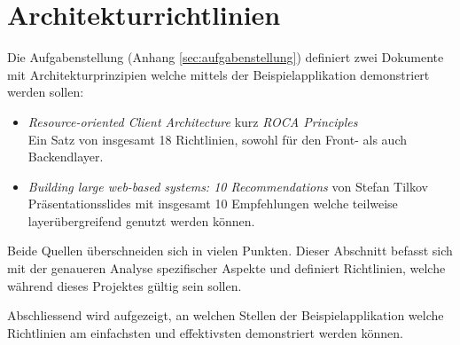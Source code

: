 \section{Architekturrichtlinien}

Die Aufgabenstellung (Anhang \ref{sec:aufgabenstellung}) definiert zwei Dokumente mit Architekturprinzipien welche mittels der Beispielapplikation demonstriert werden sollen:

\begin{itemize}
	\item \textit{Resource-oriented Client Architecture} kurz \textit{ROCA Principles} \cite{ROCA}\\
	Ein Satz von insgesamt 18 Richtlinien, sowohl für den Front- als auch Backendlayer.
	\item \textit{Building large web-based systems: 10 Recommendations} von Stefan Tilkov \cite{TilkovSlides}\\
	Präsentationsslides mit insgesamt 10 Empfehlungen welche teilweise layerübergreifend genutzt werden können.
\end{itemize}

Beide Quellen überschneiden sich in vielen Punkten. Dieser Abschnitt befasst sich mit der genaueren Analyse spezifischer Aspekte und definiert Richtlinien, welche während dieses Projektes gültig sein sollen.

Abschliessend wird aufgezeigt, an welchen Stellen der Beispielapplikation welche Richtlinien am einfachsten und effektivsten demonstriert werden können.








\newpage
